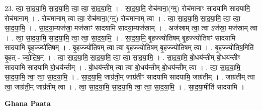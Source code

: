 \documentclass[17pt]{extarticle}
\begin{document}
23. त्वा॒ सा॒द॒या॒मि॒ सा॒द॒या॒मि॒ त्वा॒ त्वा॒ सा॒द॒या॒मि॒ । . सा॒द॒या॒मि॒ रोच॑माना॒(ग्म्॒) रोच॑मानाꣳ सादयामि सादयामि॒ रोच॑मानाम् । . रोच॑मानाम् त्वा त्वा॒ रोच॑माना॒(ग्म्॒) रोच॑मानाम् त्वा । . त्वा॒ सा॒द॒या॒मि॒ सा॒द॒या॒मि॒ त्वा॒ त्वा॒ सा॒द॒या॒मि॒ । . सा॒द॒या॒म्यज॑स्रा॒ मज॑स्राꣳ सादयामि सादया॒म्यज॑स्राम् । . अज॑स्राम् त्वा॒ त्वा ऽज॑स्रा॒ मज॑स्राम् त्वा । . त्वा॒ सा॒द॒या॒मि॒ सा॒द॒या॒मि॒ त्वा॒ त्वा॒ सा॒द॒या॒मि॒ । . सा॒द॒या॒मि॒ बृ॒हज्ज्यो॑तिषम् बृ॒हज्ज्यो॑तिषꣳ सादयामि सादयामि बृ॒हज्ज्यो॑तिषम् । . बृ॒हज्ज्यो॑तिषम् त्वा त्वा बृ॒हज्ज्यो॑तिषम् बृ॒हज्ज्यो॑तिषम् त्वा । . बृ॒हज्ज्यो॑तिष॒मिति॑ बृ॒हत् - ज्यो॒ति॒ष॒म् । . त्वा॒ सा॒द॒या॒मि॒ सा॒द॒या॒मि॒ त्वा॒ त्वा॒ सा॒द॒या॒मि॒ । . सा॒द॒या॒मि॒ बो॒धय॑न्तीम् बो॒धय॑न्तीꣳ सादयामि सादयामि बो॒धय॑न्तीम् । . बो॒धय॑न्तीम् त्वा त्वा बो॒धय॑न्तीम् बो॒धय॑न्तीम् त्वा । . त्वा॒ सा॒द॒या॒मि॒ सा॒द॒या॒मि॒ त्वा॒ त्वा॒ सा॒द॒या॒मि॒ । . सा॒द॒या॒मि॒ जाग्र॑ती॒म् जाग्र॑तीꣳ सादयामि सादयामि॒ जाग्र॑तीम् । . जाग्र॑तीम् त्वा त्वा॒ जाग्र॑ती॒म् जाग्र॑तीम् त्वा । . त्वा॒ सा॒द॒या॒मि॒ सा॒द॒या॒मि॒ त्वा॒ त्वा॒ सा॒द॒या॒मि॒ । . सा॒द॒या॒मीति॑ सादयामि । \newline

\textbf{Ghana Paata } \newline
\end{document}
